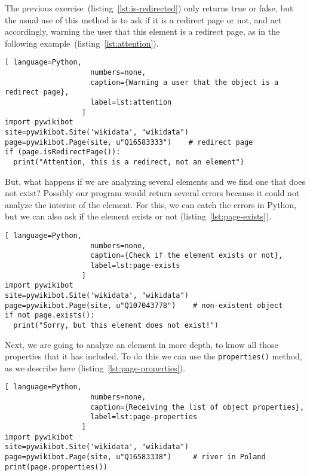 The previous exercise~(listing~\ref{lst:is-redirected}) only returns true or false, but the usual use of this method is to ask if it is a redirect page or not, and act accordingly, warning the user that this element is a redirect page, as in the following example~(listing~\ref{lst:attention}).

\begin{lstlisting}[ language=Python,
                    numbers=none,
                    caption={Warning a user that the object is a redirect page},
                    label=lst:attention
                  ]
import pywikibot
site=pywikibot.Site('wikidata', "wikidata")
page=pywikibot.Page(site, u"Q16583333")    # redirect page
if (page.isRedirectPage()):
  print("Attention, this is a redirect, not an element")
\end{lstlisting}

But, what happens if we are analyzing several elements and we find one that does not exist? Possibly our program would return several errors because it could not analyze the interior of the element. For this, we can catch the errors in Python, but we can also ask if the element exists or not (listing~\ref{lst:page-exists}).

\begin{lstlisting}[ language=Python,
                    numbers=none,
                    caption={Check if the element exists or not},
                    label=lst:page-exists
                  ]
import pywikibot
site=pywikibot.Site('wikidata', "wikidata")
page=pywikibot.Page(site, u"Q107043778")    # non-existent object
if not page.exists():
  print("Sorry, but this element does not exist!")
\end{lstlisting}

Next, we are going to analyze an element in more depth, to know all those properties that it has included. To do this we can use the \lstinline|properties()| method, as we describe here (listing~\ref{lst:page-properties}).

\begin{lstlisting}[ language=Python,
                    numbers=none,
                    caption={Receiving the list of object properties},
                    label=lst:page-properties
                  ]
import pywikibot
site=pywikibot.Site('wikidata', "wikidata")
page=pywikibot.Page(site, u"Q16583338")     # river in Poland
print(page.properties())
\end{lstlisting}

